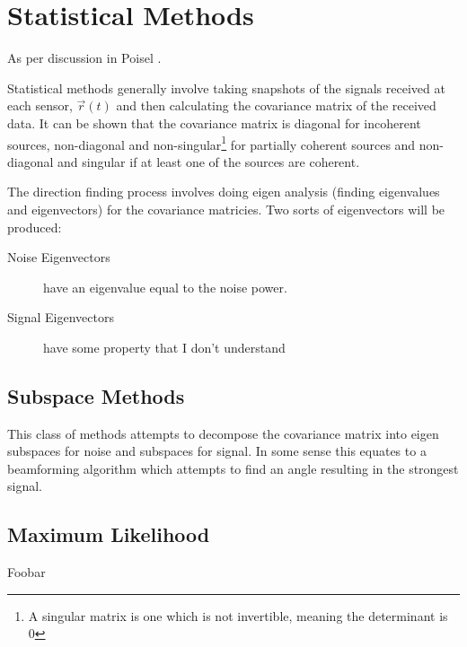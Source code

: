 \section{Statistical Methods}

As per discussion in Poisel \cite{poisel2012electronic}. 

Statistical methods generally involve taking snapshots of the signals received at each sensor, \(\vec{r}(t)\) and then calculating the covariance matrix of the received data.
It can be shown that the covariance matrix is diagonal for incoherent sources, non-diagonal and non-singular\footnote{A singular matrix is one which is not invertible, meaning the determinant is 0} for partially coherent sources and non-diagonal and singular if at least one of the sources are coherent\cite{poisel2012electronic}. 

The direction finding process involves doing eigen analysis (finding eigenvalues and eigenvectors) for the covariance matricies. 
Two sorts of eigenvectors will be produced:
\begin{description}
  \item[Noise Eigenvectors] have an eigenvalue equal to the noise power.
  \item[Signal Eigenvectors] have some property that I don't understand
\end{description}

\subsection{Subspace Methods}
This class of methods attempts to decompose the covariance matrix into eigen subspaces for noise and subspaces for signal. In some sense this equates to a beamforming algorithm which attempts to find an angle resulting in the strongest signal. 

\subsection{Maximum Likelihood}
Foobar
